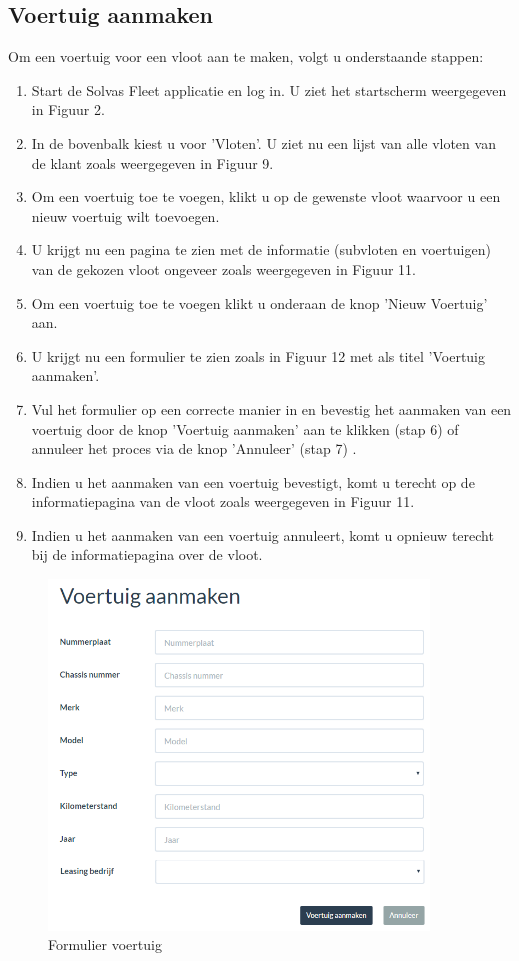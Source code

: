 \documentclass[11pt,openany]{article}
\begin{document}
\subsection{Voertuig aanmaken}
Om een voertuig voor een vloot aan te maken, volgt u onderstaande stappen:
\begin{enumerate}
	\item Start de Solvas Fleet applicatie en log in. U ziet het startscherm weergegeven in Figuur 2.
	\item In de bovenbalk kiest u voor 'Vloten'. U ziet nu een lijst van alle vloten van de klant zoals weergegeven in Figuur 9.
	\item Om een voertuig toe te voegen, klikt u op de gewenste vloot waarvoor u een nieuw voertuig wilt toevoegen. 
	\item U krijgt nu een pagina te zien met de informatie (subvloten en voertuigen) van de gekozen vloot
	ongeveer zoals weergegeven in Figuur 11. 
	\item Om een voertuig toe te voegen klikt u onderaan de knop 'Nieuw Voertuig' aan.
	\item U krijgt nu een formulier te zien zoals in Figuur 12 met als titel 'Voertuig aanmaken'.
	\item Vul het formulier op een correcte manier in en bevestig het aanmaken van een voertuig door de knop 'Voertuig aanmaken' aan te klikken (stap 6) of annuleer het proces via de knop 'Annuleer' (stap 7) .
	\item Indien u het aanmaken van een voertuig bevestigt, komt u terecht op de informatiepagina van de vloot zoals weergegeven in Figuur 11. 
	\item Indien u het aanmaken van een voertuig annuleert, komt u opnieuw terecht bij de informatiepagina over de vloot.
\end{enumerate}


\begin{figure}
	\centering
	\includegraphics[width=0.9\textwidth]{img/fig_l.png}
	\caption{Formulier voertuig}
\end{figure}
\end{document}

